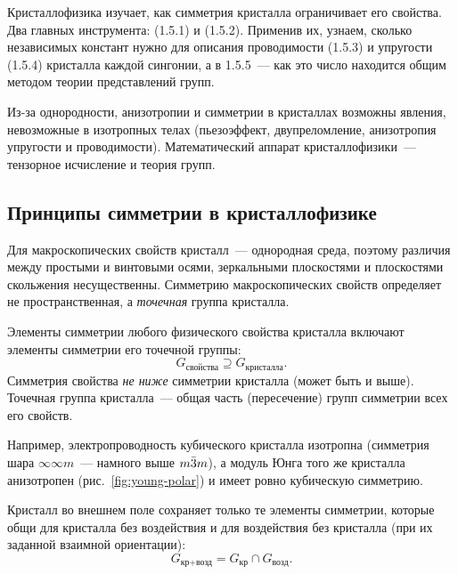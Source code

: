 \begin{orientir}
Кристаллофизика изучает, как симметрия кристалла ограничивает его
свойства. Два главных инструмента:  (1.5.1) и  (1.5.2). Применив их,
узнаем, сколько независимых констант нужно для описания проводимости
(1.5.3) и упругости (1.5.4) кристалла каждой сингонии, а в 1.5.5~—
как это число находится общим методом теории представлений групп.
\end{orientir}

Из-за однородности, анизотропии и симметрии в кристаллах возможны
явления, невозможные в изотропных телах (пьезоэффект, двупреломление,
анизотропия упругости и проводимости). Математический аппарат
кристаллофизики~— тензорное исчисление и теория групп.

\subsection{Принципы симметрии в кристаллофизике}\label{ssec:symmetry-principle}

Для макроскопических свойств кристалл~— однородная среда, поэтому
различия между простыми и винтовыми осями, зеркальными плоскостями и
плоскостями скольжения несущественны. Симметрию макроскопических
свойств определяет не пространственная, а \emph{точечная} группа
кристалла.

\begin{glavnoe}
Элементы симметрии любого физического свойства кристалла включают
элементы симметрии его точечной группы:
\begin{equation}\label{eq:neumann}
G_\text{свойства}\supseteq G_\text{кристалла} .
\end{equation}
Симметрия свойства \emph{не ниже} симметрии кристалла (может быть и
выше). Точечная группа кристалла~— общая часть (пересечение) групп
симметрии всех его свойств.
\end{glavnoe}

Например, электропроводность кубического кристалла изотропна (симметрия
шара $\infty\infty m$~— намного выше $m\bar{3}m$), а модуль Юнга того же
кристалла анизотропен (рис.~\ref{fig:young-polar}) и имеет ровно
кубическую симметрию.

\begin{glavnoe}
Кристалл во внешнем поле сохраняет только те элементы симметрии, которые
общи для кристалла без воздействия и для воздействия без кристалла (при
их заданной взаимной ориентации):
\begin{equation}\label{eq:curie-principle}
G_\text{кр+возд}=G_\text{кр}\cap G_\text{возд} .
\end{equation}
\end{glavnoe}

